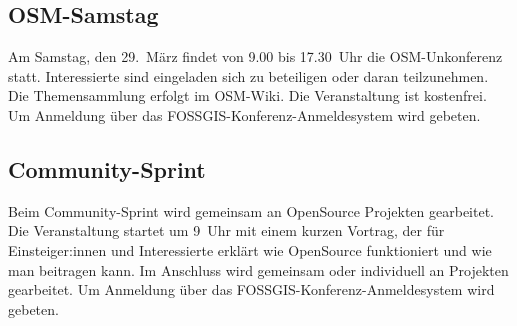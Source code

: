 \subsection*{OSM-Samstag}
Am Samstag, den 29.~März findet von 9.00 bis 17.30~Uhr die OSM-Unkonferenz statt.
Interessierte sind eingeladen sich zu beteiligen oder daran teilzunehmen.
Die Themensammlung erfolgt im OSM-Wiki. Die Veranstaltung ist kostenfrei.
Um Anmeldung über das FOSSGIS-Konferenz-Anmeldesystem wird gebeten.

\subsection*{Community-Sprint}
Beim Community-Sprint wird gemeinsam an OpenSource Projekten gearbeitet.
Die Veranstaltung startet um 9~Uhr mit einem kurzen Vortrag, der für Einsteiger:innen
und Interessierte erklärt wie OpenSource funktioniert und wie man beitragen kann.
Im Anschluss wird gemeinsam oder individuell an Projekten gearbeitet.
Um Anmeldung über das FOSSGIS-Konferenz-Anmeldesystem wird gebeten.
